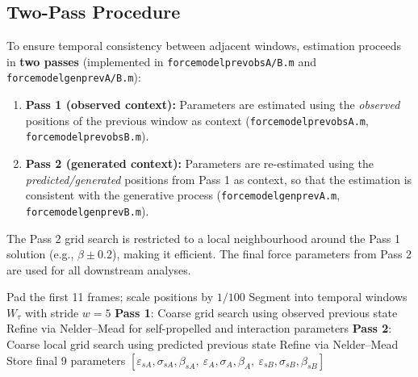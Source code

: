 \documentclass[11pt,a4paper]{article}
\begin{document}
\subsection{Two-Pass Procedure}

To ensure temporal consistency between adjacent windows, estimation proceeds in \textbf{two passes} (implemented in \texttt{forcemodelprevobsA/B.m} and \texttt{forcemodelgenprevA/B.m}):

\begin{enumerate}
    \item \textbf{Pass 1 (observed context):} Parameters are estimated using the \emph{observed} positions of the previous window as context (\texttt{forcemodelprevobsA.m}, \texttt{forcemodelprevobsB.m}).
    \item \textbf{Pass 2 (generated context):} Parameters are re-estimated using the \emph{predicted/generated} positions from Pass 1 as context, so that the estimation is consistent with the generative process (\texttt{forcemodelgenprevA.m}, \texttt{forcemodelgenprevB.m}).
\end{enumerate}

\noindent The Pass 2 grid search is restricted to a local neighbourhood around the Pass 1 solution (e.g., $\beta \pm 0.2$), making it efficient. The final force parameters from Pass 2 are used for all downstream analyses.

\begin{algorithm}[h]
\caption{Windowed Latent Force Estimation}
\begin{algorithmic}[1]
    \State Pad the first 11 frames; scale positions by $1/100$
    \State Segment into temporal windows $W_\tau$ with stride $w = 5$
        \State \textbf{Pass 1}: Coarse grid search using observed previous state
        \State \hspace{1em} Refine via Nelder--Mead for self-propelled and interaction parameters
        \State \textbf{Pass 2}: Coarse local grid search using predicted previous state
        \State \hspace{1em} Refine via Nelder--Mead
        \State Store final 9 parameters $[\varepsilon_{sA},\sigma_{sA},\beta_{sA},\ \varepsilon_A,\sigma_A,\beta_A,\ \varepsilon_{sB},\sigma_{sB},\beta_{sB}]$
    \EndFor
\EndFor
\end{algorithmic}
\end{algorithm}

\end{document}
